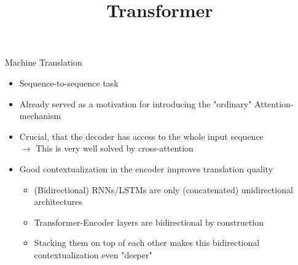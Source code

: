 



\newcommand{\titlefigure}{figure/transformer_sq.png}
\newcommand{\learninggoals}{
\item Understand the initial use of the Transformer
\item Grasp the other application fields since then}

\title{Transformer}
\date{}




\begin{vbframe}{Machine Translation}

\vfill

\begin{itemize}
	\item Sequence-to-sequence task
	\item Already served as a motivation for introducing the "ordinary" Attention-mechanism 
	\item Crucial, that the decoder has access to the whole input sequence \\
				$\to$ This is very well solved by cross-attention
	\item Good contextualization in the encoder improves translation quality
		\begin{itemize}
			\item (Bidirectional) RNNs/LSTMs are only (concatenated) unidirectional architectures
			\item Transformer-Encoder layers are bidirectional by construction
			\item Stacking them on top of each other makes this bidirectional contextualization even "deeper"
		\end{itemize}
\end{itemize}

\vfill

\end{vbframe}


